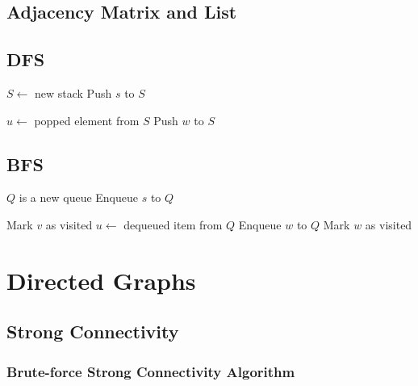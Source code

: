 \documentclass{report}
\begin{document}
\section{Adjacency Matrix and List}

\section{DFS}

\noindent \hrulefill
\begin{algorithmic}[1]
   
  \State $S \gets$ new stack
  \State Push $s$ to $S$
  \item[]
  \State $u \gets$ popped element from $S$
  \State Push $w$ to $S$
  \EndIf
  \EndFor
  \EndIf
  \EndWhile
  \EndFunction
\end{algorithmic}
\noindent \hrulefill

\section{BFS}

\noindent \hrulefill
\begin{algorithmic}[1]
   
  \State $Q$ is a new queue
  \State Enqueue $s$ to $Q$
  \item[]
  \State Mark $v$ as visited
  \State $u \gets$ dequeued item from $Q$
  \State Enqueue $w$ to $Q$
  \State Mark $w$ as visited
  \EndIf
  \EndFor
  \EndWhile
  \EndFunction
\end{algorithmic}
\noindent \hrulefill


\chapter{Directed Graphs}

\section{Strong Connectivity}

\subsection{Brute-force Strong Connectivity Algorithm}
\end{document}
